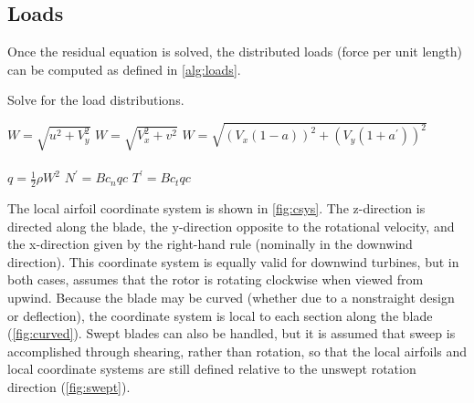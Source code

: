 \documentclass{article}
\begin{document}


\subsection{Loads}

Once the residual equation is solved, the distributed loads (force per unit length) can be computed as defined in \cref{alg:loads}.
\begin{algorithm}[htbp]
\caption{Solve for the load distributions.}
\begin{algorithmic}
\State $W = \sqrt{u^2 + V_y^2}$
\State $W = \sqrt{V_x^2 + v^2}$
\Else
\State $W = \sqrt{(V_x(1 - a))^2 + (V_y(1 + a^\prime))^2}$
\EndIf
\\
\\
\State $q = \frac{1}{2}\rho W^2$
\State $N^\prime = B c_n q c$
\State $T^\prime = B c_t q c$

\end{algorithmic}
\label{alg:loads}
\end{algorithm}

The local airfoil coordinate system is shown in \cref{fig:csys}.  The z-direction is directed along the blade, the y-direction opposite to the rotational velocity, and the x-direction given by the right-hand rule (nominally in the downwind direction).  This coordinate system is equally valid for downwind turbines, but in both cases, assumes that the rotor is rotating clockwise when viewed from upwind.  Because the blade may be curved (whether due to a nonstraight design or deflection), the coordinate system is local to each section along the blade (\cref{fig:curved}).  Swept blades can also be handled, but it is assumed that sweep is accomplished through shearing, rather than rotation, so that the local airfoils and local coordinate systems are still defined relative to the unswept rotation direction (\cref{fig:swept}).
\end{document}
